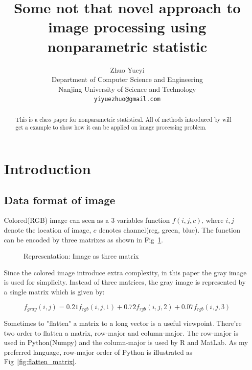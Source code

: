 \documentclass{article}
\title{Some not that novel approach to image processing using nonparametric statistic}
\author{
  Zhuo Yueyi \\ %
  Department of Computer Science and Engineering\\
  Nanjing University of Science and Technology\\
  \texttt{yiyuezhuo@gmail.com} \\
}
\begin{document}
\maketitle

\begin{abstract}
This is a class paper for nonparametric statistical. 
All of methods introduced by \cite{wasserman2006all} will get a example to show how it can be applied on
image processing problem.
\end{abstract}




\section{Introduction}




\subsection{Data format of image}

Colored(RGB) image can seen as a 3 variables function  $f(i,j,c)$, where $i,j$ denote the location of image, $c$ denotes
channel(reg, green, blue). The function can be encoded by three matrixes as shown in Fig~\ref{fig:toad_rgb}.

\begin{figure}[htb]
  \centering
  
  \caption{Representation: Image as three matrix}
  \label{fig:toad_rgb}
\end{figure}

Since the colored image introduce extra complexity, in this paper the gray image is used for simplicity.
Instead of three matrices, the gray image is represented by a single matrix which is given by:

\begin{equation}
  f_{gray}(i,j) = 0.21 f_{rgb}(i,j,1) + 0.72 f_{rgb}(i,j,2) + 0.07 f_{rgb}(i,j,3)
  \label{eq:rgb_to_gray}
\end{equation}

Sometimes to "flatten" a matrix to a long vector is a useful viewpoint. There're two order to flatten a matrix,
row-major and column-major. The row-major is used in Python(Numpy) and the column-major is used by R and MatLab.
As my preferred language, row-major order of Python is illustrated as Fig~\ref{fig:flatten_matrix}.
\end{document}
